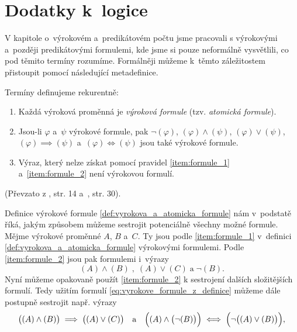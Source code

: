 \chapter{Dodatky k~logice}\label{chap:dodatky_k_logice}
V kapitole o~výrokovém a~predikátovém počtu jsme pracovali s výrokovými a~později predikátovými formulemi, kde jsme si pouze neformálně vysvětlili, co pod těmito termíny rozumíme. Formálněji můžeme k~těmto záležitostem přistoupit pomocí následující metadefinice.
\begin{definition}\label{def:vyrokova_a_atomicka_formule}
    Termíny definujeme rekurentně:
    \begin{enumerate}[label=(\roman*)]
        \item\label{item:formule_1} Každá výroková proměnná je \emph{výroková formule} (tzv. \emph{atomická formule}).
        \item\label{item:formule_2} Jsou-li $\varphi$ a~$\psi$ výrokové formule, pak $\neg (\varphi)$, $(\varphi) \land (\psi)$, $(\varphi) \lor (\psi)$, $(\varphi) \implies (\psi)$ a~$(\varphi) \iff (\psi)$ jsou také výrokové formule.
        \item\label{item:formule_3} Výraz, který nelze získat pomocí pravidel \ref{item:formule_1} a~\ref{item:formule_2} není výrokovou formulí.
    \end{enumerate}
\end{definition}
(Převzato z \cite{Fuchs2003}, str. 14 a~\cite{BalcarStepanek1986}, str. 30).\par
Definice výrokové formule \ref{def:vyrokova_a_atomicka_formule} nám v~podstatě říká, jakým způsobem můžeme sestrojit potenciálně všechny možné formule. Mějme výrokové proměnné $A$, $B$ a~$C$. Ty jsou podle \ref{item:formule_1} v~definici \ref{def:vyrokova_a_atomicka_formule} výrokovými formulemi. Podle \ref{item:formule_2} jsou pak formulemi i~výrazy
\begin{equation}\label{eq:vyrokove_formule_z_definice}
    (A) \land (B)\;,\;(A) \lor (C)\;\text{a}\;\neg(B).
\end{equation}
Nyní můžeme opakovaně použít \ref{item:formule_2} k sestrojení dalších složitějších formulí. Tedy užitím formulí \eqref{eq:vyrokove_formule_z_definice} můžeme dále postupně sestrojit např. výrazy
\begin{equation*}
    \bigl((A) \land (B)\bigr) \implies \bigl((A) \lor (C)\bigr)\quad\text{a}\quad\Bigl((A) \land \bigl(\neg(B)\bigr)\Bigr) \iff \Bigl(\neg\bigl((A) \lor (B)\bigr)\Bigr),
\end{equation*}
